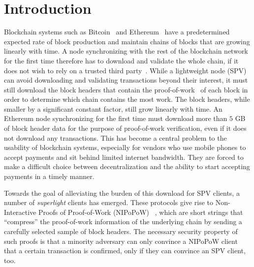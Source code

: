 \section{Introduction}
Blockchain systems such as Bitcoin~\cite{nakamoto} and
Ethereum~\cite{buterin,wood} have a predetermined expected rate of block
production and maintain chains of blocks that are growing linearly
with time. A node synchronizing with the rest of the blockchain
network for the first time therefore has to download and validate the whole
chain, if it does not wish to rely on a trusted third party~\cite{taxonomy}. While a lightweight
node (SPV) can avoid downloading and validating transactions beyond their
interest, it must still download the block headers that contain the
proof-of-work~\cite{pow} of each block in order to determine which chain contains
the most work. The block headers, while smaller by a significant constant
factor, still grow linearly with time. An Ethereum node synchronizing for the
first time must download more than $5$ GB of block header data for the purpose
of proof-of-work verification, even if it does not download any
transactions. This has become a central problem to the usability of blockchain
systems, especially for vendors who use mobile phones to accept payments
and sit behind limited internet bandwidth. They are forced to make a difficult
choice between decentralization and the ability to start accepting payments in a
timely manner.

Towards the goal of alleviating the burden of this download for SPV clients, a
number of \emph{superlight} clients has emerged.
These protocols give rise to  Non-Interactive Proofs of Proof-of-Work (NIPoPoW)
~\cite{nipopows}, which are short strings
 that ``compress'' the proof-of-work information of the underlying chain by sending a carefully selected sample of block headers.
The necessary security property of such proofs is that a
minority adversary can only convince a
NIPoPoW client that a certain transaction is confirmed, only if they can
convince an SPV client, too.

